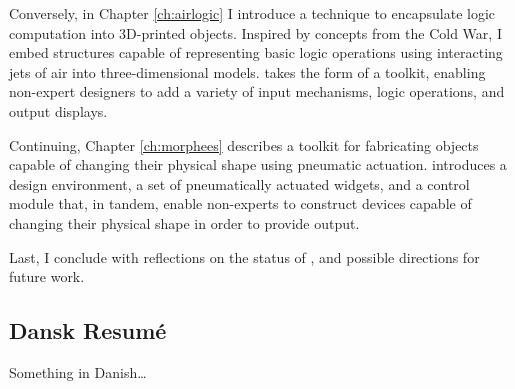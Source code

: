 		Conversely, in Chapter \ref{ch:airlogic} I introduce a technique to
		encapsulate logic computation into 3D-printed objects. Inspired by concepts
		from the Cold War, I embed structures capable of representing basic logic
		operations using interacting jets of air into three-dimensional models. \al
		takes the form of a toolkit, enabling non-expert designers to add a variety
		of input mechanisms, logic operations, and output displays.

		Continuing, Chapter \ref{ch:morphees} describes a toolkit for fabricating
		objects capable of changing their physical shape using pneumatic actuation.
		\mp introduces a design environment, a set of pneumatically actuated
		widgets, and a control module that, in tandem, enable non-experts to
		construct devices capable of changing their physical shape in order to
		provide output.

		Last, I conclude with reflections on the status of \papf, and possible
		directions for future work.

		\newpage

		\begin{otherlanguage}{danish}
			\chapter*{Dansk Resum\'e}
			Something in Danish\dots
		\end{otherlanguage}

\endgroup

	\vfill
